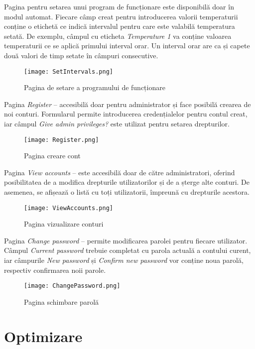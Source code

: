 	Pagina pentru setarea unui program de funcționare este disponibilă doar în modul automat. Fiecare câmp creat pentru introducerea valorii temperaturii conține o etichetă ce indică intervalul pentru care este valabilă temperatura setată. De exemplu, câmpul cu eticheta \textit{Temperature 1} va conține valoarea temperaturii ce se aplică primului interval orar. Un interval orar are ca și capete două valori de timp setate în câmpuri consecutive.  

\begin{figure}[H]
   	\centering
    	\texttt{[image: SetIntervals.png]}
	\caption{Pagina de setare a programului de funcționare}
\end{figure}

	Pagina \textit{Register} – accesibilă doar pentru administrator și face posibilă crearea de noi conturi. Formularul permite introducerea credențialelor pentru contul creat, iar câmpul \textit{Give admin privileges?} este utilizat pentru setarea drepturilor.

\begin{figure}[H]
   	\centering
    	\texttt{[image: Register.png]}
	\caption{Pagina creare cont}
\end{figure}

	Pagina \textit{View accounts} – este accesibilă doar de către administratori, oferind posibilitatea de a modifica drepturile utilizatorilor și de a șterge alte conturi. De asemenea, se afișează o listă cu toți utilizatorii, împreună cu drepturile acestora.

\begin{figure}[H]
   	\centering
    	\texttt{[image: ViewAccounts.png]}
	\caption{Pagina vizualizare conturi}
\end{figure}

	Pagina \textit{Change password} – permite modificarea parolei pentru fiecare utilizator. Câmpul \textit{Current password} trebuie completat cu parola actuală a contului curent, iar câmpurile \textit{New password} și \textit{Confirm new password} vor conține noua parolă, respectiv confirmarea noii parole.

\begin{figure}[H]
   	\centering
    	\texttt{[image: ChangePassword.png]}
	\caption{Pagina schimbare parolă}
\end{figure}

\section{Optimizare}

